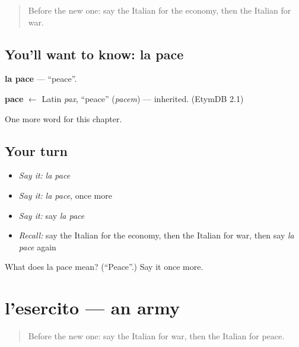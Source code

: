 \label{lesson:IT-C193-pace}



\begin{quote}
Before the new one: say the Italian for the economy, then the Italian for war.
\end{quote}

\subsection*{You'll want to know: la pace}
\textbf{la pace} — \textquotedblleft{}peace\textquotedblright{}.

\begin{cousinweb}
\textbf{pace} $\leftarrow$ Latin \emph{pax}, \textquotedblleft{}peace\textquotedblright{} (\emph{pacem}) — inherited. (EtymDB 2.1)
\end{cousinweb}

\begin{grammarlens}[title={What you've built}]
One more word for this chapter.
\end{grammarlens}

\subsection*{Your turn}
\begin{itemize}
\raggedright
  \item \emph{Say it:} \emph{la pace}
  \item \emph{Say it:} \emph{la pace}, once more
  \item \emph{Say it:} say \emph{la pace}
  \item \emph{Recall:} say the Italian for the economy, then the Italian for war, then say \emph{la pace} again
\end{itemize}

\begin{tcolorbox}[breakable,colback=teal!4,colframe=teal!35!black,title={Before you move on}]
What does la pace mean? (\textquotedblleft{}Peace\textquotedblright{}.) Say it once more.
\end{tcolorbox}
\section[l'esercito]{l'esercito — an army}

\label{lesson:IT-C193-esercito}



\begin{quote}
Before the new one: say the Italian for war, then the Italian for peace.
\end{quote}

